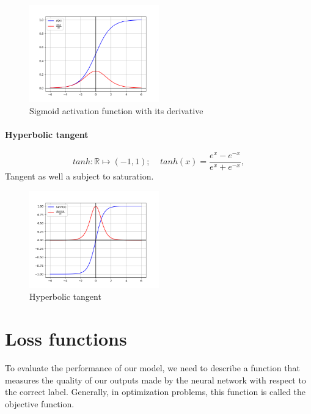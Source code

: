     \begin{figure}[h]
    \includegraphics[width=0.5\textwidth]{Images/sigmoid.png}
    \centering
    \caption{Sigmoid activation function with its derivative}
    \label{sigmoid graph}
    \end{figure}

    
    \paragraph{Hyperbolic tangent}
    \begin{equation}
    \label{def: tanh}
        tanh: \mathbb{R} \mapsto (-1,1); \; \; \; \; tanh(x)=\frac{e^x - e^{-x}}{e^x + e^{-x}}, 
    \end{equation}
    Tangent as well a subject to saturation. 
    \begin{figure}[h]
    \includegraphics[width=0.5\textwidth]{Images/tanh.png}
    \centering
    \caption{Hyperbolic tangent}
    \label{tanh graph}
    \end{figure}

\section{Loss functions}
To evaluate the performance of our model, we need to describe a function that measures the quality of our outputs made by the neural network with respect to the correct label. Generally, in optimization problems, this function is called the objective function. 


















